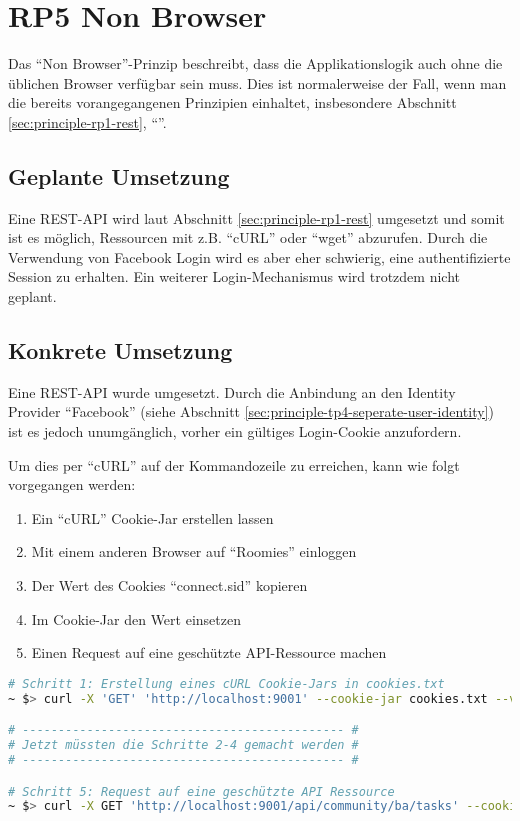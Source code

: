 \section{RP5 Non Browser}
\label{sec:principle-rp5-non-browser}

Das ``Non Browser''-Prinzip beschreibt, dass die Applikationslogik auch ohne die üblichen Browser verfügbar sein muss. Dies ist normalerweise der Fall, wenn man die bereits vorangegangenen Prinzipien einhaltet, insbesondere Abschnitt \ref{sec:principle-rp1-rest}, ``''.

\subsection*{Geplante Umsetzung}
Eine \gls{REST}-API wird laut Abschnitt \ref{sec:principle-rp1-rest} umgesetzt und somit ist es möglich, Ressourcen mit z.B. ``cURL'' \cite{curl} oder ``wget'' \cite{wget} abzurufen.
Durch die Verwendung von Facebook Login wird es aber eher schwierig, eine authentifizierte Session zu erhalten. Ein weiterer Login-Mechanismus wird trotzdem nicht geplant.

\subsection*{Konkrete Umsetzung}
Eine REST-API wurde umgesetzt. Durch die Anbindung an den Identity Provider ``Facebook'' (siehe Abschnitt \ref{sec:principle-tp4-seperate-user-identity}) ist es jedoch unumgänglich, vorher ein gültiges Login-Cookie anzufordern.

Um dies per ``cURL'' auf der Kommandozeile zu erreichen, kann wie folgt vorgegangen werden:
\begin{enumerate}
	\item Ein ``cURL'' Cookie-Jar erstellen lassen
	\item Mit einem anderen Browser auf ``Roomies'' einloggen
	\item Der Wert des Cookies ``connect.sid'' kopieren
	\item Im Cookie-Jar den Wert einsetzen
	\item Einen Request auf eine geschützte API-Ressource machen
\end{enumerate}

\begin{lstlisting}[language=Bash, caption=cURL Request auf Roomies, label=lst:curlRoomiesAPI]
# Schritt 1: Erstellung eines cURL Cookie-Jars in cookies.txt
~ $> curl -X 'GET' 'http://localhost:9001' --cookie-jar cookies.txt --verbose --location

# --------------------------------------------- #
# Jetzt müssten die Schritte 2-4 gemacht werden #
# --------------------------------------------- #

# Schritt 5: Request auf eine geschützte API Ressource
~ $> curl -X GET 'http://localhost:9001/api/community/ba/tasks' --cookie cookies.txt  --verbose --location
\end{lstlisting}

